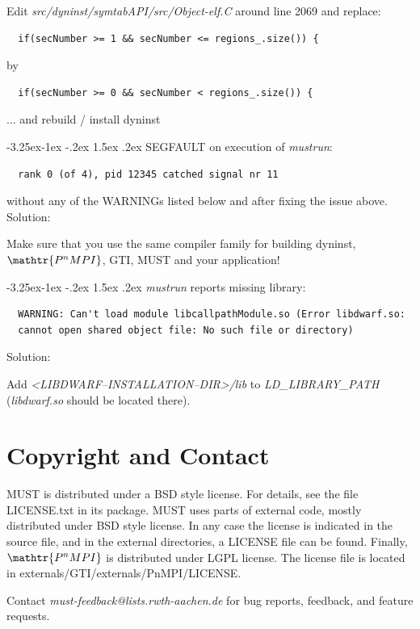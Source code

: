 \documentclass[english]{scrartcl}
\makeatletter
\newcommand{\pnmpi}{$\mathop{\mathtr{P^nMPI}}\nolimits$\xspace}
\renewcommand\paragraph{\@startsection{paragraph}{4}{\z@}%
  {-3.25ex\@plus -1ex \@minus -.2ex}%
  {1.5ex \@plus .2ex}%
  {\normalfont\normalsize\bfseries}}
\makeatother
\begin{document}
Edit \emph{src/dyninst/symtabAPI/src/Object-elf.C} around line 2069 and replace:
\begin{verbatim}
  if(secNumber >= 1 && secNumber <= regions_.size()) {
\end{verbatim}
by
\begin{verbatim}
  if(secNumber >= 0 && secNumber < regions_.size()) {
\end{verbatim}
... and rebuild / install dyninst

\paragraph{SEGFAULT on execution of \emph{mustrun}:}
\begin{verbatim}
  rank 0 (of 4), pid 12345 catched signal nr 11
\end{verbatim}
without any of the WARNINGs listed below and after fixing the issue above.\newline\newline
Solution:

Make sure that you use the same compiler family for building dyninst, \pnmpi, 
GTI, MUST and your application!

\paragraph{\emph{mustrun} reports missing library:}

\begin{verbatim}
  WARNING: Can't load module libcallpathModule.so (Error libdwarf.so: 
  cannot open shared object file: No such file or directory)
\end{verbatim}
Solution:

Add \emph{\textless LIBDWARF\mbox{--}INSTALLATION\mbox{--}DIR\textgreater/lib} to 
\emph{LD\_LIBRARY\_PATH} (\emph{libdwarf.so} should be located there).


\section{Copyright and Contact}
MUST is distributed under a BSD style license. For details, see the file
\mbox{LICENSE.txt} in its package. MUST uses parts of external code, mostly distributed under BSD style license. In any case the license is indicated in the source file, and in the external directories, a LICENSE file can be found.
Finally, \pnmpi is distributed under LGPL license. The license file is located in 
\mbox{externals/GTI/externals/PnMPI/LICENSE}.


Contact \emph{must-feedback@lists.rwth-aachen.de} for bug reports, feedback, and
feature requests.
\end{document}
